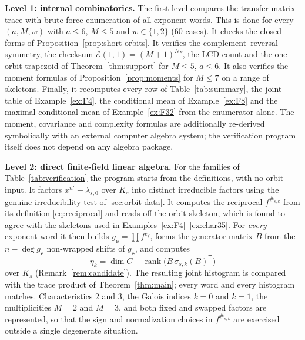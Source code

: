 \documentclass[preprint,12pt,a4paper]{elsarticle}
\newcommand{\Epoly}{\mathscr E}
\newcommand{\rank}{\operatorname{rank}}
\theoremstyle{definition}
\theoremstyle{remark}
\begin{document}
\noindent\textbf{Level 1: internal combinatorics.}  The first level
compares the transfer-matrix trace with brute-force enumeration of all exponent
words. This is done for every $(a,M,w)$ with $a\leq6$, $M\leq5$ and
$w\in\{1,2\}$ (60 cases). It checks the closed forms of
Proposition~\ref{prop:short-orbits}. It verifies the complement--reversal
symmetry, the checksum $\Epoly(1,1)=(M+1)^{N_F}$, the LCD count and the
one-orbit trapezoid of Theorem~\ref{thm:support} for $M\leq5$, $a\leq6$. It
also verifies the moment formulas of Proposition~\ref{prop:moments} for
$M\leq7$ on a range of skeletons. Finally, it recomputes every row of
Table~\ref{tab:summary}, the joint table of Example~\ref{ex:F4}, the
conditional mean of Example~\ref{ex:F8} and the maximal conditional mean of
Example~\ref{ex:F32} from the enumerator alone.
The moment, covariance and complexity formulas are additionally re-derived
symbolically with an external computer algebra system; the verification program
itself does not depend on any algebra package.

\noindent\textbf{Level 2: direct finite-field linear algebra.}  For the families of
Table~\ref{tab:verification} the program starts from the definitions, with no
orbit input. It factors $x^{n'}-\lambda_{s,0}$ over $K_s$ into distinct
irreducible factors using the genuine irreducibility test of
\ref{sec:orbit-data}. It computes the reciprocal $f^{\#_{s,k}}$ from its
definition \eqref{eq:reciprocal} and reads off the orbit skeleton, which is
found to agree with the skeletons used in
Examples~\ref{ex:F4}--\ref{ex:char35}. For \emph{every} exponent word it then
builds $g_{\mathbf{e}}=\prod f^{e_f}$, forms the generator matrix $B$ from the
$n-\deg g_{\mathbf{e}}$ non-wrapped shifts of $g_{\mathbf{e}}$, and computes
\[
\eta_k=\dim C-\rank\bigl(B\,\sigma_{s,k}(B)^{\mathsf T}\bigr)
\]
over $K_s$ (Remark~\ref{rem:candidate}).  The resulting joint histogram is
compared with the trace product of Theorem~\ref{thm:main}; every word and every
histogram matches.  Characteristics $2$ and $3$, the Galois indices $k=0$ and
$k=1$, the multiplicities $M=2$ and $M=3$, and both fixed and swapped factors
are represented, so that the sign and normalization choices in $f^{\#_{s,k}}$
are exercised outside a single degenerate situation.
\end{document}
